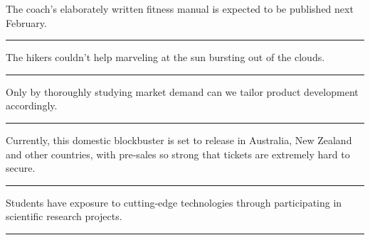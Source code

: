 \documentclass[11pt,a4paper]{article}
\newcommand{\num}[1]{\makebox[1.9em][r]{#1.}\hspace{0.3em}}
\newcommand{\wline}{\noindent\rule{\linewidth}{0.4pt}}
\begin{document}
\vspace{0.35em}\vspace{0.15em}

\begin{minipage}{\linewidth}

\num{9}The coach’s elaborately written fitness manual is expected to be published next February.

\vspace{0.25em}

\wline

\end{minipage}

\begin{minipage}{\linewidth}

\num{10}The hikers couldn’t help marveling at the sun bursting out of the clouds.

\vspace{0.25em}

\wline

\end{minipage}

\begin{minipage}{\linewidth}

\num{11}Only by thoroughly studying market demand can we tailor product development accordingly.

\vspace{0.25em}

\wline

\end{minipage}

\begin{minipage}{\linewidth}

\num{12}Currently, this domestic blockbuster is set to release in Australia, New Zealand and other countries, with pre-sales so strong that tickets are extremely hard to secure.

\vspace{0.25em}

\wline

\end{minipage}

\vspace{0.35em}\vspace{0.15em}

\begin{minipage}{\linewidth}

\num{13}Students have exposure to cutting-edge technologies through participating in scientific research projects.

\vspace{0.25em}

\wline

\end{minipage}
\end{document}
